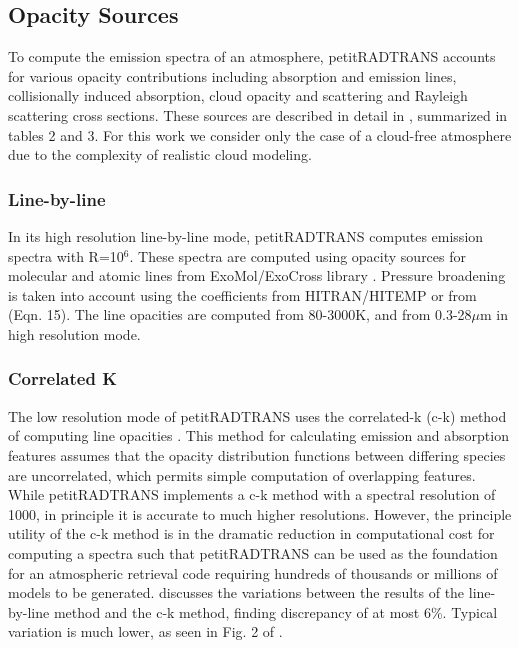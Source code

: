 \parencite{Guillot2010} %
\subsection{Opacity Sources}
To compute the emission spectra of an atmosphere, petitRADTRANS accounts for various opacity contributions including absorption and emission lines, collisionally induced absorption, cloud opacity and scattering and Rayleigh scattering cross sections. These sources are described in detail in \parencite{Molliere2019}, summarized in tables 2 and 3. For this work we consider only the case of a cloud-free atmosphere due to the complexity of realistic cloud modeling.
\subsubsection{Line-by-line}
In its high resolution line-by-line mode, petitRADTRANS computes emission spectra with R=10$^{6}$. 
These spectra are computed using opacity sources for molecular and atomic lines from ExoMol/ExoCross library \parencite{Yurchenko2018}. Pressure broadening is taken into account using the coefficients from HITRAN/HITEMP \parencite{Rothman2010,Rothman2013} or from \parencite{Sharp2007} (Eqn. 15). The line opacities are computed from 80-3000K, and from 0.3-28$\mu$m in high resolution mode.
\subsubsection{Correlated K}
The low resolution mode of petitRADTRANS uses the correlated-k (c-k) method of computing line opacities \parencite{Goody1989,Lacis1991,Fu1992}. 
This method for calculating emission and absorption features assumes that the opacity distribution functions between differing species are uncorrelated, which permits simple computation of overlapping features. 
While petitRADTRANS implements a c-k method with a spectral resolution of 1000, in principle it is accurate to much higher resolutions.
However, the principle utility of the c-k method is in the dramatic reduction in computational cost for computing a spectra such that petitRADTRANS can be used as the foundation for an atmospheric retrieval code requiring hundreds of thousands or millions of models to be generated. 
\parencite{Molliere2019} discusses the variations between the results of the line-by-line method and the c-k method, finding discrepancy of at most 6\%.
Typical variation is much lower, as seen in Fig. 2 of \parencite{Molliere2019}.
